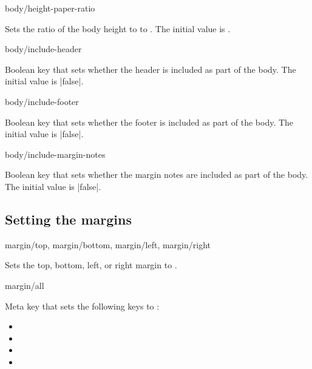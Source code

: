 \documentclass{beerydoc}
\begin{document}
\begin{code}{body/height-paper-ratio}
  \begin{syntax}
  \end{syntax}
  Sets the ratio of the body height to  to .
  The initial value is .
\end{code}

\begin{code}{body/include-header}
  \begin{syntax}
  \end{syntax}
  Boolean key that sets whether the header is included as part of the body.
  The initial value is |false|.
\end{code}

\begin{code}{body/include-footer}
  \begin{syntax}
  \end{syntax}
  Boolean key that sets whether the footer is included as part of the body.
  The initial value is |false|.
\end{code}

\begin{code}{body/include-margin-notes}
  \begin{syntax}
  \end{syntax}
  Boolean key that sets whether the margin notes are included as part of the
  body.
  The initial value is |false|.
\end{code}

\subsection{Setting the margins}
\label{subsec:margins}

\begin{code}{margin/top, margin/bottom, margin/left, margin/right}
  \begin{syntax}
  \end{syntax}
  Sets the top, bottom, left, or right margin to .
\end{code}

\begin{code}{margin/all}
  \begin{syntax}
  \end{syntax}
  Meta key that sets the following keys to :
  \begin{itemize}
    \item {}
    \item {}
    \item {}
    \item {}
  \end{itemize}
\end{code}
\end{document}
